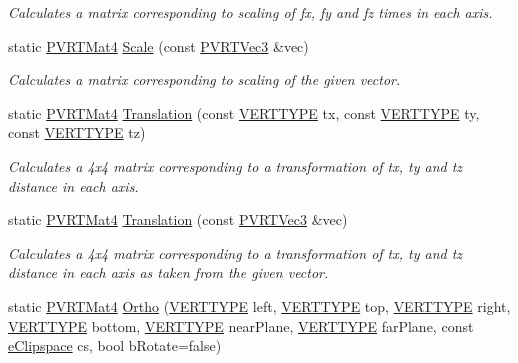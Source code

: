 \begin{DoxyCompactItemize}
\begin{DoxyCompactList}\small\item\em Calculates a matrix corresponding to scaling of fx, fy and fz times in each axis. \end{DoxyCompactList}\item 
static \hyperlink{struct_p_v_r_t_mat4}{P\+V\+R\+T\+Mat4} \hyperlink{struct_p_v_r_t_mat4_a8176fbced1f4b5071b1704b3a9b0144e}{Scale} (const \hyperlink{struct_p_v_r_t_vec3}{P\+V\+R\+T\+Vec3} \&vec)
\begin{DoxyCompactList}\small\item\em Calculates a matrix corresponding to scaling of the given vector. \end{DoxyCompactList}\item 
static \hyperlink{struct_p_v_r_t_mat4}{P\+V\+R\+T\+Mat4} \hyperlink{struct_p_v_r_t_mat4_ac8394275725110b7ad5f14d05fd4d1fe}{Translation} (const \hyperlink{group___a_p_i___o_g_l_e_s_ga06da457b7d3e93368ab904f89e1396be}{V\+E\+R\+T\+T\+Y\+P\+E} tx, const \hyperlink{group___a_p_i___o_g_l_e_s_ga06da457b7d3e93368ab904f89e1396be}{V\+E\+R\+T\+T\+Y\+P\+E} ty, const \hyperlink{group___a_p_i___o_g_l_e_s_ga06da457b7d3e93368ab904f89e1396be}{V\+E\+R\+T\+T\+Y\+P\+E} tz)
\begin{DoxyCompactList}\small\item\em Calculates a 4x4 matrix corresponding to a transformation of tx, ty and tz distance in each axis. \end{DoxyCompactList}\item 
static \hyperlink{struct_p_v_r_t_mat4}{P\+V\+R\+T\+Mat4} \hyperlink{struct_p_v_r_t_mat4_a6defc16dddcdd71133deb60e954aab9d}{Translation} (const \hyperlink{struct_p_v_r_t_vec3}{P\+V\+R\+T\+Vec3} \&vec)
\begin{DoxyCompactList}\small\item\em Calculates a 4x4 matrix corresponding to a transformation of tx, ty and tz distance in each axis as taken from the given vector. \end{DoxyCompactList}\item 
static \hyperlink{struct_p_v_r_t_mat4}{P\+V\+R\+T\+Mat4} \hyperlink{struct_p_v_r_t_mat4_a37c75ef39deda650899a195b90b36883}{Ortho} (\hyperlink{group___a_p_i___o_g_l_e_s_ga06da457b7d3e93368ab904f89e1396be}{V\+E\+R\+T\+T\+Y\+P\+E} left, \hyperlink{group___a_p_i___o_g_l_e_s_ga06da457b7d3e93368ab904f89e1396be}{V\+E\+R\+T\+T\+Y\+P\+E} top, \hyperlink{group___a_p_i___o_g_l_e_s_ga06da457b7d3e93368ab904f89e1396be}{V\+E\+R\+T\+T\+Y\+P\+E} right, \hyperlink{group___a_p_i___o_g_l_e_s_ga06da457b7d3e93368ab904f89e1396be}{V\+E\+R\+T\+T\+Y\+P\+E} bottom, \hyperlink{group___a_p_i___o_g_l_e_s_ga06da457b7d3e93368ab904f89e1396be}{V\+E\+R\+T\+T\+Y\+P\+E} near\+Plane, \hyperlink{group___a_p_i___o_g_l_e_s_ga06da457b7d3e93368ab904f89e1396be}{V\+E\+R\+T\+T\+Y\+P\+E} far\+Plane, const \hyperlink{struct_p_v_r_t_mat4_aad804cddb0d3f6799550aaa703d71e96}{e\+Clipspace} cs, bool b\+Rotate=false)

\end{DoxyCompactItemize}
